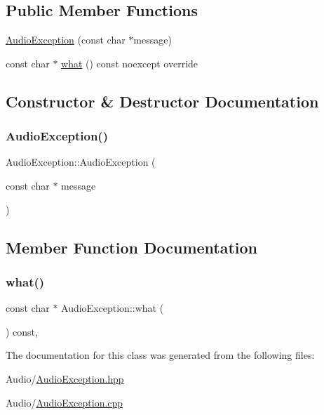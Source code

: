 \subsection*{Public Member Functions}
\begin{DoxyCompactItemize}
\item 
\mbox{\hyperlink{classAudioException_a9c5ef764e8d5fc3d30f460dfb81f52f2}{Audio\+Exception}} (const char $\ast$message)
\item 
const char $\ast$ \mbox{\hyperlink{classAudioException_a716323fd41ca04077585f2fcb6658b89}{what}} () const noexcept override
\end{DoxyCompactItemize}


\subsection{Constructor \& Destructor Documentation}
\mbox{\label{classAudioException_a9c5ef764e8d5fc3d30f460dfb81f52f2}} 
\subsubsection{\texorpdfstring{Audio\+Exception()}{AudioException()}}
{\footnotesize\ttfamily Audio\+Exception\+::\+Audio\+Exception (\begin{DoxyParamCaption}\item[{const char $\ast$}]{message }\end{DoxyParamCaption})\hspace{0.3cm}{\ttfamily [explicit]}}



\subsection{Member Function Documentation}
\mbox{\label{classAudioException_a716323fd41ca04077585f2fcb6658b89}} 
\subsubsection{\texorpdfstring{what()}{what()}}
{\footnotesize\ttfamily const char $\ast$ Audio\+Exception\+::what (\begin{DoxyParamCaption}{ }\end{DoxyParamCaption}) const\hspace{0.3cm}{\ttfamily [override]}, {\ttfamily [noexcept]}}



The documentation for this class was generated from the following files\+:\begin{DoxyCompactItemize}
\item 
Audio/\mbox{\hyperlink{AudioException_8hpp}{Audio\+Exception.\+hpp}}\item 
Audio/\mbox{\hyperlink{AudioException_8cpp}{Audio\+Exception.\+cpp}}\end{DoxyCompactItemize}
